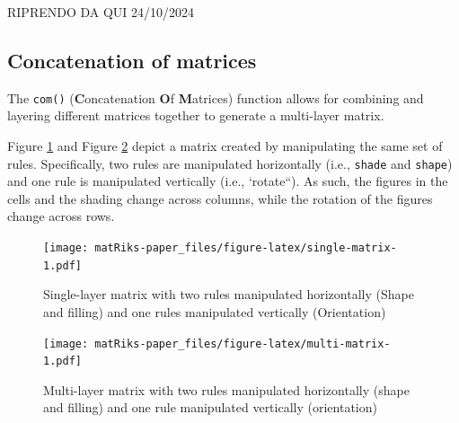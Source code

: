 RIPRENDO DA QUI 24/10/2024

\subsection{Concatenation of matrices}\label{concatenation-of-matrices}

The \texttt{com()} (\textbf{C}oncatenation \textbf{O}f \textbf{M}atrices) function allows for combining and layering different matrices together to generate a multi-layer matrix.

Figure \ref{fig:single-matrix} and Figure \ref{fig:multi-matrix} depict a matrix created by manipulating the same set of rules. Specifically, two rules are manipulated horizontally (i.e., \texttt{shade} and \texttt{shape}) and one rule is manipulated vertically (i.e., `rotate``). As such, the figures in the cells and the shading change across columns, while the rotation of the figures change across rows.

\begin{figure}
\centering
\texttt{[image: matRiks-paper\_files/figure-latex/single-matrix-1.pdf]}
\caption{\label{fig:single-matrix}Single-layer matrix with two rules manipulated horizontally (Shape and filling) and one rules manipulated vertically (Orientation)}
\end{figure}

\begin{figure}
\centering
\texttt{[image: matRiks-paper\_files/figure-latex/multi-matrix-1.pdf]}
\caption{\label{fig:multi-matrix}Multi-layer matrix with two rules manipulated horizontally (shape and filling) and one rule manipulated vertically (orientation)}
\end{figure}

